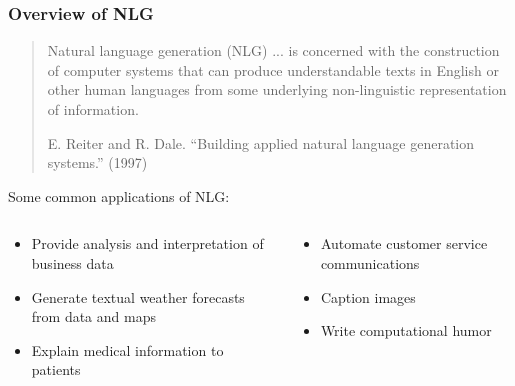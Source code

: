 \begin{frame}
\frametitle{Overview of NLG}

\begin{quote}
	Natural language generation (NLG) ... is concerned with the
	construction of computer systems that can produce understandable texts
	in English or other human languages from some underlying
	non-linguistic representation of information.
	
	\vspace{6pt}
	
	\footnotesize E. Reiter and R. Dale. ``Building applied natural
	language generation systems.'' (1997)
\end{quote}

\vspace{12pt}

Some common applications of NLG:

\vspace{12pt}

\begin{columns}

	\begin{column}{0.5\textwidth}
	\begin{itemize}
	
	\item Provide analysis and interpretation of business data
		
	\item Generate textual weather forecasts from data and maps
	
	\item Explain medical information to patients
	
	\end{itemize}
	\end{column}
	
	\begin{column}{0.5\textwidth}
	\begin{itemize}
	
	\item Automate customer service communications
	
	\item Caption images
	
	\item Write computational humor
	
	\end{itemize}
	\end{column}

\end{columns}

\end{frame}
